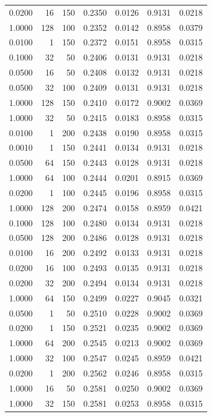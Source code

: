 \begin{tabular}{rrrrrrr}
0.0200 & 16 & 150 & 0.2350 & 0.0126 & 0.9131 & 0.0218 \\
1.0000 & 128 & 100 & 0.2352 & 0.0142 & 0.8958 & 0.0379 \\
0.0100 & 1 & 150 & 0.2372 & 0.0151 & 0.8958 & 0.0315 \\
0.1000 & 32 & 50 & 0.2406 & 0.0131 & 0.9131 & 0.0218 \\
0.0500 & 16 & 50 & 0.2408 & 0.0132 & 0.9131 & 0.0218 \\
0.0500 & 32 & 100 & 0.2409 & 0.0131 & 0.9131 & 0.0218 \\
1.0000 & 128 & 150 & 0.2410 & 0.0172 & 0.9002 & 0.0369 \\
1.0000 & 32 & 50 & 0.2415 & 0.0183 & 0.8958 & 0.0315 \\
0.0100 & 1 & 200 & 0.2438 & 0.0190 & 0.8958 & 0.0315 \\
0.0010 & 1 & 150 & 0.2441 & 0.0134 & 0.9131 & 0.0218 \\
0.0500 & 64 & 150 & 0.2443 & 0.0128 & 0.9131 & 0.0218 \\
1.0000 & 64 & 100 & 0.2444 & 0.0201 & 0.8915 & 0.0369 \\
0.0200 & 1 & 100 & 0.2445 & 0.0196 & 0.8958 & 0.0315 \\
1.0000 & 128 & 200 & 0.2474 & 0.0158 & 0.8959 & 0.0421 \\
0.1000 & 128 & 100 & 0.2480 & 0.0134 & 0.9131 & 0.0218 \\
0.0500 & 128 & 200 & 0.2486 & 0.0128 & 0.9131 & 0.0218 \\
0.0100 & 16 & 200 & 0.2492 & 0.0133 & 0.9131 & 0.0218 \\
0.0200 & 16 & 100 & 0.2493 & 0.0135 & 0.9131 & 0.0218 \\
0.0200 & 32 & 200 & 0.2494 & 0.0134 & 0.9131 & 0.0218 \\
1.0000 & 64 & 150 & 0.2499 & 0.0227 & 0.9045 & 0.0321 \\
0.0500 & 1 & 50 & 0.2510 & 0.0228 & 0.9002 & 0.0369 \\
0.0200 & 1 & 150 & 0.2521 & 0.0235 & 0.9002 & 0.0369 \\
1.0000 & 64 & 200 & 0.2545 & 0.0213 & 0.9002 & 0.0369 \\
1.0000 & 32 & 100 & 0.2547 & 0.0245 & 0.8959 & 0.0421 \\
0.0200 & 1 & 200 & 0.2562 & 0.0246 & 0.8958 & 0.0315 \\
1.0000 & 16 & 50 & 0.2581 & 0.0250 & 0.9002 & 0.0369 \\
1.0000 & 32 & 150 & 0.2581 & 0.0253 & 0.8958 & 0.0315 \\

\end{tabular}
